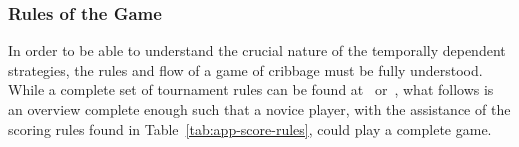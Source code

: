 
\subsubsection*{Rules of the Game}

In order to be able to understand the crucial nature of the temporally dependent
strategies, the rules and flow of a game of cribbage must be fully understood.
%
While a complete set of tournament rules can be found at~\cite{ACC_rules}
or~\cite{ACC_rulebook},
what follows is an overview complete enough such that a novice player,
with the assistance of the scoring rules found in Table~\ref{tab:app-score-rules},
could play a complete game.



